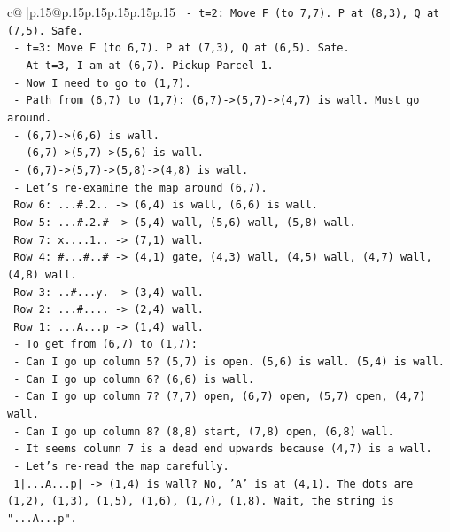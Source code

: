 \documentclass{article}
\begin{document}
{\begin{supertabular}{c@{$\;$}|p{.15\linewidth}@{}p{.15\linewidth}p{.15\linewidth}p{.15\linewidth}p{.15\linewidth}p{.15\linewidth}}
{{{\texttt{   {-} t=2: Move F (to 7,7). P at (8,3), Q at (7,5). Safe.} \\
\texttt{   {-} t=3: Move F (to 6,7). P at (7,3), Q at (6,5). Safe.} \\
\texttt{   {-} At t=3, I am at (6,7). Pickup Parcel 1.} \\
\texttt{   {-} Now I need to go to (1,7).} \\
\texttt{   {-} Path from (6,7) to (1,7): (6,7){-}>(5,7){-}>(4,7) is wall. Must go around.} \\
\texttt{   {-} (6,7){-}>(6,6) is wall.} \\
\texttt{   {-} (6,7){-}>(5,7){-}>(5,6) is wall.} \\
\texttt{   {-} (6,7){-}>(5,7){-}>(5,8){-}>(4,8) is wall.} \\
\texttt{   {-} Let's re{-}examine the map around (6,7).} \\
\texttt{     Row 6: ...\#.2.. {-}> (6,4) is wall, (6,6) is wall.} \\
\texttt{     Row 5: ...\#.2.\# {-}> (5,4) wall, (5,6) wall, (5,8) wall.} \\
\texttt{     Row 7: x....1.. {-}> (7,1) wall.} \\
\texttt{     Row 4: \#...\#..\# {-}> (4,1) gate, (4,3) wall, (4,5) wall, (4,7) wall, (4,8) wall.} \\
\texttt{     Row 3: ..\#...y. {-}> (3,4) wall.} \\
\texttt{     Row 2: ...\#.... {-}> (2,4) wall.} \\
\texttt{     Row 1: ...A...p {-}> (1,4) wall.} \\
\texttt{   {-} To get from (6,7) to (1,7):} \\
\texttt{     {-} Can I go up column 5? (5,7) is open. (5,6) is wall. (5,4) is wall.} \\
\texttt{     {-} Can I go up column 6? (6,6) is wall.} \\
\texttt{     {-} Can I go up column 7? (7,7) open, (6,7) open, (5,7) open, (4,7) wall.} \\
\texttt{     {-} Can I go up column 8? (8,8) start, (7,8) open, (6,8) wall.} \\
\texttt{     {-} It seems column 7 is a dead end upwards because (4,7) is a wall.} \\
\texttt{     {-} Let's re{-}read the map carefully.} \\
\texttt{       1|...A...p| {-}> (1,4) is wall? No, 'A' is at (4,1). The dots are (1,2), (1,3), (1,5), (1,6), (1,7), (1,8). Wait, the string is "...A...p".} \\
}}}
\end{supertabular}}
\end{document}
